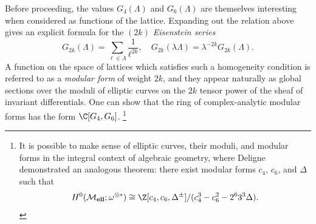 \begin{remark}\label{MFRemark}
Before proceeding, the values \(G_4(\Lambda)\) and \(G_6(\Lambda)\) are themselves interesting when considered as functions of the lattice.
Expanding out the relation above gives an explicit formula for the \textit{\((2k)\){\th} Eisenstein series} \[G_{2k}(\Lambda) = \sum_{\ell \in \Lambda} \frac{1}{\ell^{2k}}, \quad G_{2k}(\lambda \Lambda) = \lambda^{-2k} G_{2k}(\Lambda).\]
A function on the space of lattices which satisfies such a homogeneity condition is referred to as a \textit{modular form} of weight \(2k\), and they appear naturally as global sections over the moduli of elliptic curves on the \(2k\){\th} tensor power of the sheaf of invariant differentials.
One can show that the ring of complex-analytic modular forms has the form \(\C[G_4, G_6]\).%
\footnote{%
It is possible to make sense of elliptic curves, their moduli, and modular forms in the integral context of algebraic geometry, where Deligne demonstrated an analogous theorem: there exist modular forms \(c_4\), \(c_6\), and \(\Delta\) such that \[H^0(\moduli{ell}; \omega^{\otimes *}) \cong \Z[c_4, c_6, \Delta^{\pm}] / (c_4^3 - c_6^2 - 2^6 3^3 \Delta).\]
}
\end{remark}

